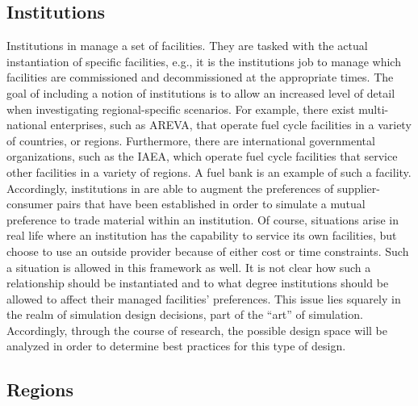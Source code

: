 \subsection{Institutions}

Institutions in \Cyclus manage a set of facilities. They are tasked with the
actual instantiation of specific facilities, e.g., it is the institutions job to
manage which facilities are commissioned and decommissioned at the appropriate
times. The goal of including a notion of institutions is to allow an increased
level of detail when investigating regional-specific scenarios. For example,
there exist multi-national enterprises, such as AREVA, that operate fuel cycle
facilities in a variety of countries, or regions. Furthermore, there are
international governmental organizations, such as the IAEA, which operate fuel
cycle facilities that service other facilities in a variety of regions. A fuel
bank is an example of such a facility. Accordingly, institutions in \Cyclus are
able to augment the preferences of supplier-consumer pairs that have been
established in order to simulate a mutual preference to trade material within an
institution. Of course, situations arise in real life where an institution has
the capability to service its own facilities, but choose to use an outside
provider because of either cost or time constraints. Such a situation is allowed
in this framework as well. It is not clear how such a relationship should be
instantiated and to what degree institutions should be allowed to affect their
managed facilities' preferences. This issue lies squarely in the realm of
simulation design decisions, part of the ``art'' of simulation. Accordingly,
through the course of research, the possible design space will be analyzed in
order to determine best practices for this type of design.

\subsection{Regions}

